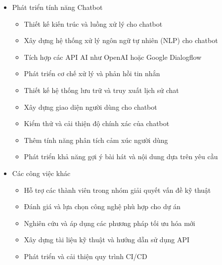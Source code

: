 \begin{itemize}
    \item Phát triển tính năng Chatbot
    \begin{itemize}
        \item Thiết kế kiến trúc và luồng xử lý cho chatbot
        \item Xây dựng hệ thống xử lý ngôn ngữ tự nhiên (NLP) cho chatbot
        \item Tích hợp các API AI như OpenAI hoặc Google Dialogflow
        \item Phát triển cơ chế xử lý và phản hồi tin nhắn
        \item Thiết kế hệ thống lưu trữ và truy xuất lịch sử chat
        \item Xây dựng giao diện người dùng cho chatbot
        \item Kiểm thử và cải thiện độ chính xác của chatbot
        \item Thêm tính năng phân tích cảm xúc người dùng
        \item Phát triển khả năng gợi ý bài hát và nội dung dựa trên yêu cầu
    \end{itemize}
    
    \item Các công việc khác
    \begin{itemize}
        \item Hỗ trợ các thành viên trong nhóm giải quyết vấn đề kỹ thuật
        \item Đánh giá và lựa chọn công nghệ phù hợp cho dự án
        \item Nghiên cứu và áp dụng các phương pháp tối ưu hóa mới
        \item Xây dựng tài liệu kỹ thuật và hướng dẫn sử dụng API
        \item Phát triển và cải thiện quy trình CI/CD
    \end{itemize}
\end{itemize}


